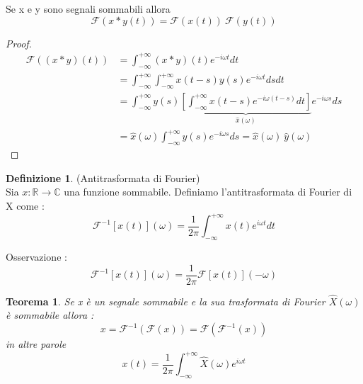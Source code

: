 \documentclass{article}
\newtheorem{teorema}{Teorema}[subsection]
\theoremstyle{definition}
\newtheorem*{definizione}{Definizione}
\newcommand{\R}{\mathbb{R}}
\newcommand{\intinf}{\int_{-\infty}^{+\infty}}
\newcommand{\f}{\mathscr{F}}
\begin{document}
\begin{enumerate}
	Se x e y sono segnali sommabili allora 
	$$\f(x*y(t))=\f(x(t))\ \f(y(t))$$
\begin{proof}
	\begin{align*}
	\f((x*y)(t))&=\intinf (x*y)(t)e^{-i\omega t}dt\\
	&=\intinf \intinf x(t-s)y(s) e^{-i\omega t} ds dt\\
	&= \intinf y(s)\underbrace{\left[\intinf x(t-s)e^{-i \omega (t-s)}dt\right] }_{\widehat{x}(\omega)}e^{-i\omega s} ds \\
	&= \widehat{x}(\omega) \intinf y(s)e^{-i\omega s} ds = \widehat{x}(\omega)\ \widehat{y}(\omega)
\end{align*}
\end{proof}
\end{enumerate}
\begin{definizione}(Antitrasformata di Fourier)\\
Sia $x:\R\rightarrow \mathbb{C}$ una funzione sommabile. Definiamo l'antitrasformata di Fourier di X come : 
$$\f^{-1}[x(t)](\omega)=\frac{1}{2\pi}\intinf x(t)e^{i\omega t}dt$$
\end{definizione}
Osservazione : $$\f^{-1}[x(t)](\omega)=\frac{1}{2\pi}\f[x(t)](-\omega)$$
\begin{teorema}
	Se x è un segnale sommabile e la sua trasformata di Fourier $\widehat{X}(\omega)$ è sommabile allora : 
	$$x=\f^{-1}(\f(x))=\f(\f^{-1}(x))$$
	in altre parole 
	$$x(t)=\frac{1}{2\pi}\intinf \widehat{X}(\omega)e^{i\omega t}$$
\end{teorema}
\end{document}
